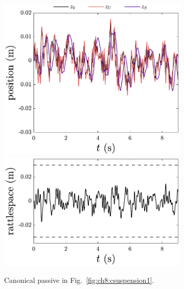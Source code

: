 \begin{figure}

\begin{subfigure}[b]{0.5\textwidth}
\centering
\includegraphics[width=\textwidth]{../ch8/figures/design3-position}
\includegraphics[width=\textwidth]{../ch8/figures/design3-rattlespace}
\caption{Canonical passive in Fig.~\ref{fig:ch8:csuspension1}.\label{fig:ch8:results1}}
\end{subfigure}%
\begin{subfigure}[b]{0.5\textwidth}
\centering

\end{subfigure}
\end{figure}
